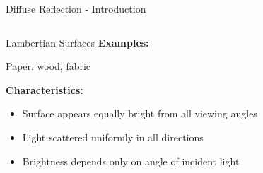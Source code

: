 
\begin{frame}{Diffuse Reflection - Introduction}
  \begin{columns}
    \begin{column}{0.7\textwidth}
      \begin{conceptbox}{Lambertian Surfaces}
        \small
        \textbf{Examples:}

        Paper, wood, fabric

        \vspace{0.3cm}
        \textbf{Characteristics:}
        \begin{itemize}
          \item Surface appears equally bright from all viewing angles
          \item Light scattered uniformly in all directions
          \item Brightness depends only on angle of incident light
        \end{itemize}
      \end{conceptbox}
    \end{column}
    \begin{column}{0.3\textwidth}
\end{column}
\end{columns}
\end{frame}
